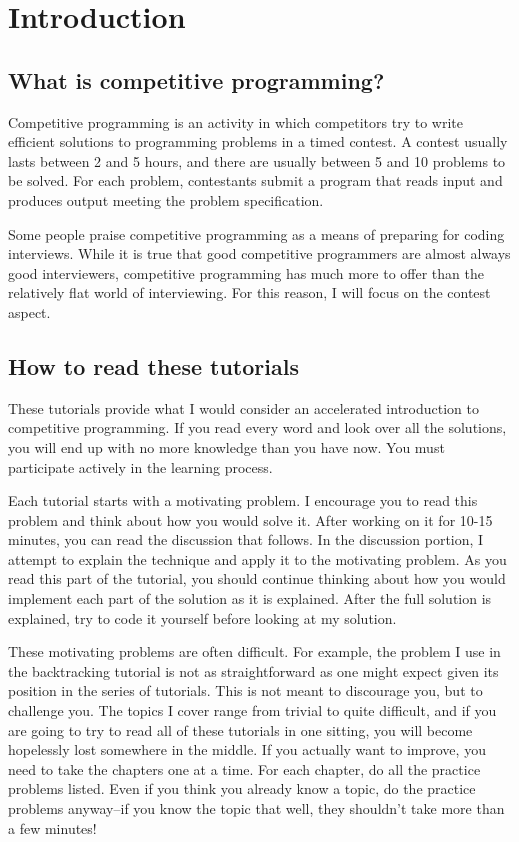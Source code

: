 \section{Introduction}

\subsection*{What is competitive programming?}

Competitive programming is an activity in which competitors try to write efficient solutions to programming problems in a timed contest. A contest usually lasts between 2 and 5 hours, and there are usually between 5 and 10 problems to be solved. For each problem, contestants submit a program that reads input and produces output meeting the problem specification.

Some people praise competitive programming as a means of preparing for coding interviews. While it is true that good competitive programmers are almost always good interviewers, competitive programming has much more to offer than the relatively flat world of interviewing. For this reason, I will focus on the contest aspect.

\subsection*{How to read these tutorials}

These tutorials provide what I would consider an accelerated introduction to competitive programming. If you read every word and look over all the solutions, you will end up with no more knowledge than you have now. You must participate actively in the learning process.

Each tutorial starts with a motivating problem. I encourage you to read this problem and think about how you would solve it. After working on it for 10-15 minutes, you can read the discussion that follows. In the discussion portion, I attempt to explain the technique and apply it to the motivating problem. As you read this part of the tutorial, you should continue thinking about how you would implement each part of the solution as it is explained. After the full solution is explained, try to code it yourself before looking at my solution.

These motivating problems are often difficult. For example, the problem I use in the backtracking tutorial is not as straightforward as one might expect given its position in the series of tutorials. This is not meant to discourage you, but to challenge you. The topics I cover range from trivial to quite difficult, and if you are going to try to read all of these tutorials in one sitting, you will become hopelessly lost somewhere in the middle. If you actually want to improve, you need to take the chapters one at a time. For each chapter, do all the practice problems listed. Even if you think you already know a topic, do the practice problems anyway--if you know the topic that well, they shouldn't take more than a few minutes!

